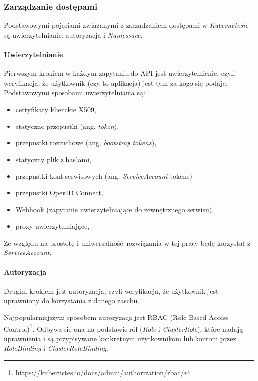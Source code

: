 \documentclass[a4paper,12pt,twoside,openany]{report}
\providecommand{\tightlist}{%
  \setlength{\itemsep}{0pt}\setlength{\parskip}{0pt}}
\DeclareRobustCommand{\href}[2]{#2\footnote{\url{#1}}}
\begin{document}
\hypertarget{zarzux105dzanie-dostux119pami}{%
\subsubsection{Zarządzanie
dostępami}\label{zarzux105dzanie-dostux119pami}}

Podstawowymi pojęciami związanymi z zarządzaniem dostępami w
\emph{Kubernetesie} są uwierzytelnianie, autoryzacja i \emph{Namespace}.

\hypertarget{uwierzytelnianie}{%
\paragraph{Uwierzytelnianie}\label{uwierzytelnianie}}

Pierwszym krokiem w każdym zapytaniu do API jest uwierzytelnienie, czyli
weryfikacja, że użytkownik (czy to aplikacja) jest tym za kogo się
podaje. Podstawowymi sposobami uwierzytelniania są:

\begin{itemize}
\tightlist
\item
  certyfikaty klienckie X509,
\item
  statyczne przepustki (ang. \emph{token}),
\item
  przepustki rozruchowe (ang. \emph{bootstrap tokens}),
\item
  statyczny plik z hasłami,
\item
  przepustki kont serwisowych (ang. \emph{ServiceAccount} tokens),
\item
  przepustki OpenID Connect,
\item
  Webhook (zapytanie uwierzytelniające do zewnętrznego serwisu),
\item
  proxy uwierzytelniające,
\end{itemize}

Ze względu na prostotę i uniwersalność~rozwiązania w tej pracy będę
korzystał z \emph{ServiceAccount}.

\hypertarget{autoryzacja}{%
\paragraph{Autoryzacja}\label{autoryzacja}}

Drugim krokiem jest autoryzacja, czyli weryfikacja, że użytkownik jest
uprawniony do korzystania z danego zasobu.

Najpopularniejszym sposobem autoryzacji jest
\href{https://kubernetes.io/docs/admin/authorization/rbac/}{RBAC (Role
Based Access Control)}. Odbywa się ona na podstawie ról (\emph{Role} i
\emph{ClusterRole}), które nadają uprawnienia i są przypisywane
konkretnym użytkownikom lub kontom przez \emph{RoleBinding} i
\emph{ClusterRoleBinding}.
\end{document}
